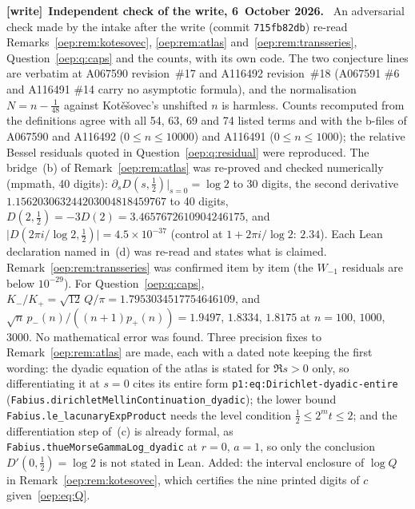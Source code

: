 \documentclass[11pt,letterpaper]{article}
\theoremstyle{remark}\newtheorem{remark}[theorem]{Remark}
\newcommand{\file}[1]{\nolinkurl{#1}}
\newenvironment{writenote}[1][]{\par\smallskip\begingroup\small
 \noindent\textbf{[write]}\if\relax\detokenize{#1}\relax\else~\textbf{#1.}\fi\ }%
 {\par\endgroup\smallskip}
\begin{document}
\begin{writenote}[Independent check of the write, 6~October 2026]
An adversarial check made by the intake after the write (commit
\file{715fb82db}) re-read Remarks~\ref{oep:rem:kotesovec},
\ref{oep:rem:atlas} and~\ref{oep:rem:transseries}, Question~\ref{oep:q:caps}
and the counts, with its own code. The two conjecture lines are verbatim at
A067590 revision~\#17 and A116492 revision~\#18 (A067591 \#6 and A116491
\#14 carry no asymptotic formula), and the normalisation $N=n-\frac1{48}$
against Kot\v e\v sovec's unshifted $n$ is harmless. Counts recomputed from
the definitions agree with all 54, 63, 69 and 74 listed terms and with the
b-files of A067590 and A116492 ($0\le n\le10000$) and A116491
($0\le n\le1000$); the relative Bessel residuals quoted in
Question~\ref{oep:q:residual} were reproduced. The bridge~(b) of
Remark~\ref{oep:rem:atlas} was re-proved and checked numerically (mpmath, 40 digits):
$\partial_sD(s,\frac12)|_{s=0}=\log2$ to 30 digits, the second derivative
$1.156203063244203004818459767$ to 40 digits, $D(2,\frac12)=-3D(2)=3.4657672610904246175$,
and $\lvert D(2\pi i/\log2,\frac12)\rvert=4.5\times10^{-37}$ (control at
$1+2\pi i/\log2$: $2.34$). Each Lean declaration named in~(d) was re-read and
states what is claimed. Remark~\ref{oep:rem:transseries} was confirmed item
by item (the $W_{-1}$ residuals are below $10^{-29}$). For
Question~\ref{oep:q:caps}, $K_-/K_+=\sqrt{12}\,Q/\pi=1.7953034517754646109$,
and $\sqrt n\,p_-(n)/((n+1)p_+(n))=1.9497$, $1.8334$, $1.8175$ at $n=100$,
$1000$, $3000$. No mathematical error was found. Three precision fixes to
Remark~\ref{oep:rem:atlas} are made, each with a dated note keeping the first
wording: the dyadic equation of the atlas is stated for $\Re s>0$ only, so
differentiating it at $s=0$ cites its entire form
\file{p1:eq:Dirichlet-dyadic-entire}
(\file{Fabius.dirichletMellinContinuation_dyadic}); the lower bound
\file{Fabius.le_lacunaryExpProduct} needs the level condition
$\frac12\le2^mt\le2$; and the differentiation step of~(c) is already formal,
as \file{Fabius.thueMorseGammaLog_dyadic} at $r=0$, $a=1$, so only the
conclusion $D'(0,\frac12)=\log2$ is not stated in Lean. Added: the interval
enclosure of $\log Q$ in Remark~\ref{oep:rem:kotesovec}, which certifies the
nine printed digits of $c$ given~\eqref{oep:eq:Q}.
\end{writenote}
\end{document}
